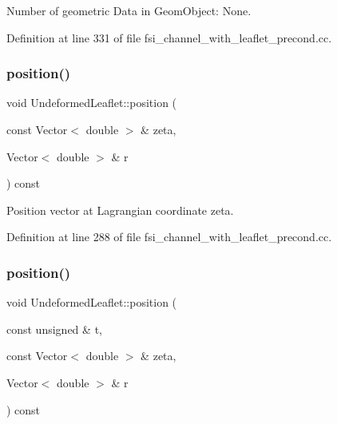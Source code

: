 Number of geometric Data in Geom\+Object\+: None. 



Definition at line 331 of file fsi\+\_\+channel\+\_\+with\+\_\+leaflet\+\_\+precond.\+cc.

\mbox{\label{classUndeformedLeaflet_a8e9b79702eb9a38e19886b84aeb47918}} 
\subsubsection{\texorpdfstring{position()}{position()}\hspace{0.1cm}{\footnotesize\ttfamily [1/2]}}
{\footnotesize\ttfamily void Undeformed\+Leaflet\+::position (\begin{DoxyParamCaption}\item[{const Vector$<$ double $>$ \&}]{zeta,  }\item[{Vector$<$ double $>$ \&}]{r }\end{DoxyParamCaption}) const\hspace{0.3cm}{\ttfamily [inline]}}



Position vector at Lagrangian coordinate zeta. 



Definition at line 288 of file fsi\+\_\+channel\+\_\+with\+\_\+leaflet\+\_\+precond.\+cc.

\mbox{\label{classUndeformedLeaflet_a6949784da1030dd63ef741d170ef9798}} 
\subsubsection{\texorpdfstring{position()}{position()}\hspace{0.1cm}{\footnotesize\ttfamily [2/2]}}
{\footnotesize\ttfamily void Undeformed\+Leaflet\+::position (\begin{DoxyParamCaption}\item[{const unsigned \&}]{t,  }\item[{const Vector$<$ double $>$ \&}]{zeta,  }\item[{Vector$<$ double $>$ \&}]{r }\end{DoxyParamCaption}) const\hspace{0.3cm}{\ttfamily [inline]}}




